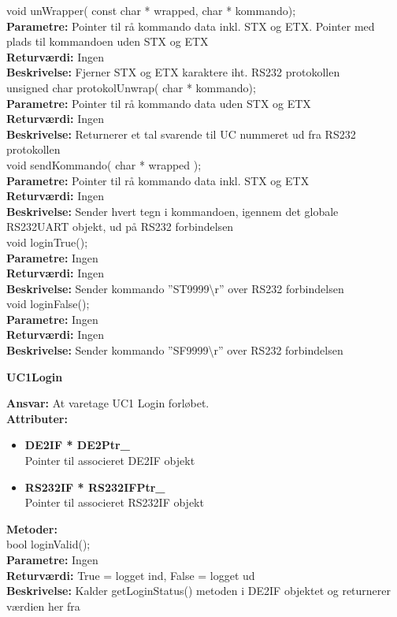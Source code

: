 void unWrapper( const char * wrapped, char * kommando); \\
\textbf{Parametre:} Pointer til rå kommando data inkl. STX og ETX. Pointer med plads til kommandoen uden STX og ETX \\
\textbf{Returværdi:} Ingen \\
\textbf{Beskrivelse:} Fjerner STX og ETX karaktere iht. RS232 protokollen\\

unsigned char protokolUnwrap( char * kommando); \\
\textbf{Parametre:} Pointer til rå kommando data uden STX og ETX \\
\textbf{Returværdi:} Ingen \\
\textbf{Beskrivelse:} Returnerer et tal svarende til UC nummeret ud fra RS232 protokollen \\

void sendKommando( char * wrapped ); \\
\textbf{Parametre:} Pointer til rå kommando data inkl. STX og ETX \\
\textbf{Returværdi:} Ingen \\
\textbf{Beskrivelse:} Sender hvert tegn i kommandoen, igennem det globale RS232UART objekt, ud på RS232 forbindelsen\\

void loginTrue(); \\
\textbf{Parametre:} Ingen \\
\textbf{Returværdi:} Ingen \\
\textbf{Beskrivelse:} Sender kommando ''ST9999\textbackslash r'' over RS232 forbindelsen\\

void loginFalse(); \\
\textbf{Parametre:} Ingen \\
\textbf{Returværdi:} Ingen \\
\textbf{Beskrivelse:} Sender kommando ''SF9999\textbackslash r'' over RS232 forbindelsen\\

%
%
{\centering
\textbf{UC1Login}\par
}
\textbf{Ansvar:} At varetage UC1 Login forløbet. \\
\textbf{Attributer:}
\begin{itemize}
	\item \textbf{DE2IF * DE2Ptr\_} \\
	Pointer til associeret DE2IF objekt
	\item \textbf{RS232IF * RS232IFPtr\_} \\
	Pointer til associeret RS232IF objekt
\end{itemize}
\textbf{Metoder:} \\
bool loginValid(); \\
\textbf{Parametre:} Ingen \\
\textbf{Returværdi:} True = logget ind, False = logget ud \\
\textbf{Beskrivelse:} Kalder getLoginStatus() metoden i DE2IF objektet og returnerer værdien her fra \\

